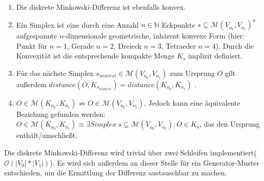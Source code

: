 \begin{enumerate}
		\item Die diskrete Minkowski-Differenz ist ebenfalls konvex.
		\item Ein Simplex ist eine durch eine Anzahl $n\in\mathbb{N}$ Eckpunkte $s\subseteq\mathcal{M}(V_{o_0}, V_{o_1})^n$ aufgespannte $n$-dimensionale geometrische, inhärent konvexe Form (hier: Punkt für $n=1$, Gerade $n=2$, Dreieck $n=3$, Tetraeder $n=4$). Durch die Konvexität ist die entsprechende kompakte Menge $K_s$ implizit definiert.
		\item Für das nächste Simplex $s_{nearest} \in \mathcal{M}(V_{o_0}, V_{o_1})$ zum Ursprung $O$ gilt außerdem $distance(O, K_{s_{nearest}}) = distance(K_{o_0}, K_{o_1})$ \cite[p. 195]{gjk}. 
		\item $O \in \mathcal{M}(K_{o_0}, K_{o_1}) \nRightarrow O \in \mathcal{M}(V_{o_0}, V_{o_1})$. Jedoch kann eine äquivalente Beziehung gefunden werden: $O \in \mathcal{M}(K_{o_0}, K_{o_1}) \equiv \exists Simplex~s \subseteq \mathcal{M}(V_{o_0}, V_{o_1}) : O \in K_s$, das den Ursprung enthält/umschließt.

\end{enumerate}
Die diskrete Minkowski-Differenz wird trivial über zwei Schleifen implementiert($\mathcal{O}(|V_0| * |V_1|)$). Es wird sich außerdem an dieser Stelle für ein Generator-Muster entschieden, um die Ermittlung der Differenz austauschbar zu machen.

